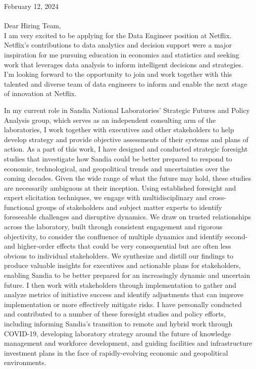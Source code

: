 \documentclass[10pt]{article}
\begin{document}
	

\noindent February 12, 2024\\\\
\noindent Dear Hiring Team,\\

I am very excited to be applying for the Data Engineer position at Netflix. Netflix's contributions to data analytics and decision support were a major inspiration for me pursuing education in economics and statistics and seeking work that leverages data analysis to inform intelligent decisions and strategies. I'm looking forward to the opportunity to join and work together with this talented and diverse team of data engineers to inform and enable the next stage of innovation at Netflix. 

In my current role in Sandia National Laboratories' Strategic Futures and Policy Analysis group, which serves as an independent consulting arm of the laboratories, I work together with executives and other stakeholders to help develop strategy and provide objective assessments of their systems and plans of action. As a part of this work, I have designed and conducted strategic foresight studies that investigate how Sandia could be better prepared to respond to economic, technological, and geopolitical trends and uncertainties over the coming decades. Given the wide range of what the future may hold, these studies are necessarily ambiguous at their inception. Using established foresight and expert elicitation techniques, we engage with multidisciplinary and cross-functional groups of stakeholders and subject matter experts to identify foreseeable challenges and disruptive dynamics. We draw on trusted relationships across the laboratory, built through consistent engagement and rigorous objectivity, to consider the confluence of multiple dynamics and identify second- and higher-order effects that could be very consequential but are often less obvious to individual stakeholders. We synthesize and distill our findings to produce valuable insights for executives and actionable plans for stakeholders, enabling Sandia to be better prepared for an increasingly dynamic and uncertain future. I then work with stakeholders through implementation to gather and analyze metrics of initiative success and identify adjustments that can improve implementation or more effectively mitigate risks. I have personally conducted and contributed to a number of these foresight studies and policy efforts, including informing Sandia's transition to remote and hybrid work through COVID-19, developing laboratory strategy around the future of knowledge management and workforce development, and guiding facilities and infrastructure investment plans in the face of rapidly-evolving economic and geopolitical environments.
\end{document}
